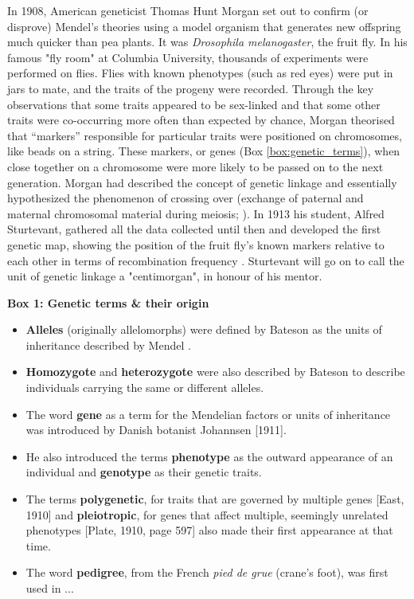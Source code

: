 In 1908, American geneticist Thomas Hunt Morgan set out to confirm (or disprove) Mendel’s theories using a model organism that generates new offspring much quicker than pea plants. 
It was \textit{Drosophila melanogaster}, the fruit fly. 
In his famous "fly room" at Columbia University, thousands of experiments were performed on flies. 
Flies with known phenotypes (such as red eyes) were put in jars to mate, and the traits of the progeny were recorded. 
Through the key observations that some traits appeared to be sex-linked and that some other traits were co-occurring more often than expected by chance, Morgan theorised that “markers” responsible for particular traits were positioned on chromosomes, like beads on a string. 
These markers, or genes (Box \ref{box:genetic_terms}), when close together on a chromosome were more likely to be passed on to the next generation. 
Morgan had described the concept of genetic linkage and essentially hypothesized the phenomenon of crossing over (exchange of paternal and maternal chromosomal material during meiosis; \cite{morgan1911random}). 
In 1913 his student, Alfred Sturtevant, gathered all the data collected until then and developed the first genetic map, showing the position of the fruit fly’s known markers relative to each other in terms of recombination frequency \cite{sturtevant1913linear}. 
Sturtevant will go on to call the unit of genetic linkage a "centimorgan", in honour of his mentor.\\

\newpage


\begin{Comment}
\hspace{-2.5mm}\textbf{Box 1: Genetic terms \& their origin}\label{box:genetic_terms}
\small
\begin{itemize}
    \item \textbf{Alleles} (originally allelomorphs) were defined by Bateson as the units of inheritance described by Mendel \cite{bateson2013mendel}.
    \item \textbf{Homozygote} and \textbf{heterozygote} were also described by Bateson to describe individuals carrying the same or different alleles.
    \item The word \textbf{gene} as a term for the Mendelian factors or units of inheritance was introduced by Danish botanist Johannsen [1911]. 
    \item He also introduced the terms \textbf{phenotype} as the outward appearance of an individual and \textbf{genotype} as their genetic traits. 
    \item The terms \textbf{polygenetic}, for traits that are governed by multiple genes [East, 1910] and \textbf{pleiotropic}, for genes that affect multiple, seemingly unrelated phenotypes [Plate, 1910, page 597] also made their first appearance at that time. 
    \item The word \textbf{pedigree}, from the French \textit{pied de grue} (crane's foot), was first used in ...
\end{itemize}
\vspace{3mm}
\end{Comment}

